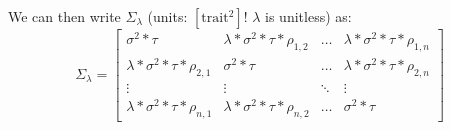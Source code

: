 \documentclass{article}
\begin{document}
We can then write $\Sigma_{\lambda}$ (units: $[\mathrm{trait}^2]$! $\lambda$ is unitless) as:
\begin{equation*}
	\Sigma_{\lambda} = 
	\begin{bmatrix}
		\sigma^2*\tau & \lambda*\sigma^2*\tau*\rho_{1,2}  & \ldots & \lambda*\sigma^2*\tau*\rho_{1,n}\\
		\lambda*\sigma^2*\tau*\rho_{2,1} & \sigma^2*\tau & \ldots  & \lambda*\sigma^2*\tau*\rho_{2,n} \\
		\vdots & \vdots & \ddots & \vdots \\
		\lambda*\sigma^2*\tau*\rho_{n,1} & \lambda*\sigma^2*\tau*\rho_{n,2}  &  \ldots & \sigma^2*\tau
	\end{bmatrix}
\end{equation*}\\








	

	
\end{document}
